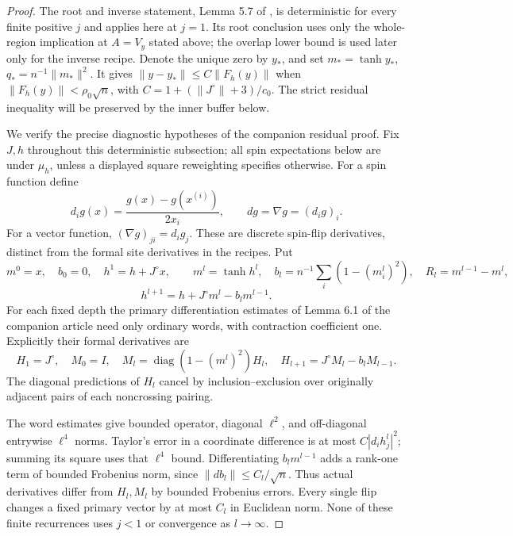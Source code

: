 \begin{proof}
The root and inverse statement, Lemma 5.7 of
\cite{AcceptedGap}, is deterministic for every finite positive
$j$ and applies here at $j=1$. Its root conclusion uses only the
whole-region implication at \(A=V_y\) stated above; the overlap
lower bound is used later only for the inverse recipe.
Denote the unique zero by $y_*$,
and set $m_* =\tanh y_*$, $q_*=n^{-1}\|m_*\|^2$.
It gives \(\|y-y_*\|\le C\|F_h(y)\|\) when
\(\|F_h(y)\|<\rho_0\sqrt n\), with
\(C=1+(\|J^\circ\|+3)/c_0\). The strict residual inequality
will be preserved by the inner buffer below.

We verify the precise diagnostic hypotheses of the companion residual
proof. Fix \(J,h\) throughout this deterministic subsection; all
spin expectations below are under \(\mu_h\), unless a displayed
square reweighting specifies otherwise. For a spin function define
\[
 d_i g(x)=\frac{g(x)-g(x^{(i)})}{2x_i},\qquad
 dg=\nabla g=(d_i g)_i.
\]
For a vector function, \((\nabla g)_{ji}=d_i g_j\).
These are discrete spin-flip derivatives, distinct from the
formal site derivatives in the recipes. Put
\[
 m^0=x,\quad b_0=0,\quad h^1=h+J^\circ x,\qquad
 m^l=\tanh h^l,\quad b_l=n^{-1}\sum_i(1-(m_i^l)^2),\quad
 R_l=m^{l-1}-m^l,
\]
\[
 h^{l+1}=h+J^\circ m^l-b_lm^{l-1}.
\]
For each fixed depth the primary differentiation estimates of
Lemma 6.1 of the companion article need only ordinary words, with
contraction coefficient one.  Explicitly their formal derivatives are
\[
 H_1=J^\circ,\quad M_0=I,\quad
 M_l=\operatorname{diag}(1-(m^l)^2)H_l,\quad
 H_{l+1}=J^\circ M_l-b_lM_{l-1}.
\]
The diagonal predictions of $H_l$ cancel by inclusion--exclusion over
originally adjacent pairs of each noncrossing pairing.

The word
estimates give bounded operator, diagonal $\ell^2$, and off-diagonal
entrywise $\ell^4$ norms.  Taylor's error in a coordinate difference
is at most $C|d_i h_j^l|^2$; summing its square uses that $\ell^4$
bound.  Differentiating $b_lm^{l-1}$ adds a rank-one term of bounded
Frobenius norm, since $\|db_l\|\le C_l/\sqrt n$.
Thus actual derivatives differ from $H_l,M_l$ by bounded Frobenius
errors.  Every single flip changes a fixed primary vector by at most
$C_l$ in Euclidean norm.  None of these finite recurrences uses
$j<1$ or convergence as $l\to\infty$.


\end{proof}
